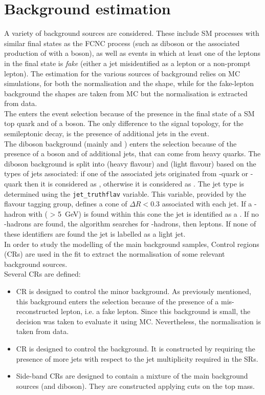 \section{Background estimation}
\label{sec:background}
A variety of background sources are considered.
These include SM processes with similar final states as the FCNC \tZc
process (such as diboson or the associated production of \ttbar with
a \PZ boson), as well as events in which at least one of the leptons
in the final state is \textit{fake} (either a jet misidentified as a
lepton or a non-prompt lepton).
The estimation for the various sources of background relies on MC
simulations, for both the normalisation and the shape, while for the
\ttbar fake-lepton background the shapes are taken from MC but the
normalisation is extracted from data. \\
The \ttZ enters the event selection because of the presence in the
final state of a SM top quark and of a \PZ boson. The only difference
to the signal topology, for the semileptonic \ttbar decay, is the
presence of additional jets in the event. \\
The diboson background (mainly \PW\PZ and \PZ\PZ) enters the selection because of the presence
of a \PZ boson and of additional jets, that can come from heavy
quarks. 
The diboson background is split into \VVHF (heavy flavour) and \VVLF (light flavour) based on the types of jets associated:
if one of the associated jets originated from \Pqb-quark or \Pqc-quark then it is considered as \VVHF, otherwise it is considered as \VVLF. %
The jet type is determined using the \texttt{jet\_truthflav} variable.
This variable, provided by the flavour tagging group, defines a cone of $\Delta R < 0.3$ associated with each jet.
If a \Pqb-hadron with ( \pT > \SI{5}{\GeV}) is found within this cone the jet is identified as a \bjet.
If no \Pqb-hadrons are found, the algorithm searches for \Pqc-hadrons, then \Pgt leptons.
If none of these identifiers are found the jet is labelled as a light jet.\\
In order to study the modelling of the main background samples, Control regions (CRs) are used in the fit to extract the normalisation of some relevant background sources.\\
Several CRs are defined:
\begin{itemize}
\item \ttbar CR is designed to control the minor \ttbar
background. As previously mentioned, this background enters the
selection because of the presence of a mis-reconstructed lepton,
i.e. a fake lepton. Since this background is small, the decision was
taken to evaluate it using MC. Nevertheless, the normalisation is
taken from data. 
\item \ttZ CR is designed to control the \ttZ
background. It is constructed by requiring the presence of more jets
with respect to the jet multiplicity required in the SRs.
\item Side-band CRs are designed to contain a mixture
of the main background sources (\ttZ and diboson). They are
constructed applying cuts on the top mass.
\end{itemize}

